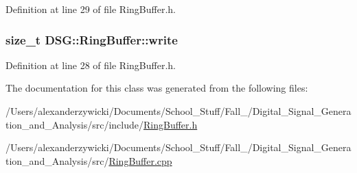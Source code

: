 Definition at line 29 of file Ring\+Buffer.\+h.

\hypertarget{classDSG_1_1RingBuffer_a703434b6afb87f1f9a05750278a822e3}{
\subsubsection[{write}]{\setlength{\rightskip}{0pt plus 5cm}size\+\_\+t D\+S\+G\+::\+Ring\+Buffer\+::write\hspace{0.3cm}{\ttfamily [protected]}}}\label{classDSG_1_1RingBuffer_a703434b6afb87f1f9a05750278a822e3}


Definition at line 28 of file Ring\+Buffer.\+h.



The documentation for this class was generated from the following files\+:\begin{DoxyCompactItemize}
\item 
/\+Users/alexanderzywicki/\+Documents/\+School\+\_\+\+Stuff/\+Fall\+\_/\+Digital\+\_\+\+Signal\+\_\+\+Generation\+\_\+and\+\_\+\+Analysis/src/include/\hyperlink{RingBuffer_8h}{Ring\+Buffer.\+h}\item 
/\+Users/alexanderzywicki/\+Documents/\+School\+\_\+\+Stuff/\+Fall\+\_/\+Digital\+\_\+\+Signal\+\_\+\+Generation\+\_\+and\+\_\+\+Analysis/src/\hyperlink{RingBuffer_8cpp}{Ring\+Buffer.\+cpp}\end{DoxyCompactItemize}
